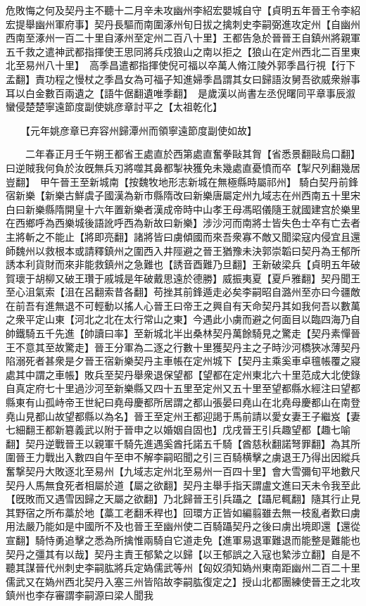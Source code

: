 危敗悔之何及契丹主不聽十二月辛未攻幽州李紹宏嬰城自守【貞明五年晉王令李紹宏提舉幽州軍府事】契丹長驅而南圍涿州旬日拔之擒刺史李嗣弼進攻定州【自幽州西南至涿州一百二十里自涿州至定州二百八十里】王都告急於晉晉王自鎮州將親軍五千救之遣神武都指揮使王思同將兵戍狼山之南以拒之【狼山在定州西北二百里東北至易州八十里】　高季昌遣都指揮使倪可福以卒萬人脩江陵外郭季昌行視【行下孟翻】責功程之慢杖之季昌女為可福子知進婦季昌謂其女曰歸語汝舅吾欲威衆辦事耳以白金數百兩遺之【語牛倨翻遺唯季翻】　是歲漢以尚書左丞倪曙同平章事辰溆蠻侵楚楚寧遠節度副使姚彦章討平之【太祖乾化】

　　【元年姚彦章已弃容州歸潭州而領寧遠節度副使如故】

　　二年春正月壬午朔王都省王處直於西第處直奮拳敺其胷【省悉景翻敺烏口翻】曰逆賊我何負於汝旣無兵刃將噬其鼻都掣袂獲免未幾處直憂憤而卒【掣尺列翻幾居豈翻】　甲午晉王至新城南【按魏牧地形志新城在無極縣時屬祁州】騎白契丹前鋒宿新樂【新樂古鮮虞子國漢為新市縣隋改曰新樂唐屬定州九域志在州西南五十里宋白曰新樂縣隋開皇十六年置新樂者漢成帝時中山孝王母馮昭儀隨王就國建宫於樂里在西鄉呼為西樂城後語訛呼西為新故曰新樂】涉沙河而南將士皆失色士卒有亡去者主將斬之不能止【將即亮翻】諸將皆曰虜傾國而來吾衆寡不敵又聞梁寇内侵宜且還師魏州以救根本或請釋鎮州之圍西入井陘避之晉王猶豫未決郭崇韜曰契丹為王郁所誘本利貨財而來非能救鎮州之急難也【誘音酉難乃旦翻】王新破梁兵【貞明五年破賀瓌于胡柳又破王瓚于戚城是年破戴思遠於德勝】威振夷夏【夏戶雅翻】契丹聞王至心沮氣索【沮在呂翻索昔各翻】苟挫其前鋒遁走必矣李嗣昭自潞州至亦曰今疆敵在前吾有進無退不可輕動以搖人心晉王曰帝王之興自有天命契丹其如我何吾以數萬之衆平定山東【河北之北在太行常山之東】今遇此小虜而避之何面目以臨四海乃自帥鐵騎五千先進【帥讀曰率】至新城北半出桑林契丹萬餘騎見之驚走【契丹素憚晉王不意其至故驚走】晉王分軍為二逐之行數十里獲契丹主之子時沙河橋狹冰薄契丹陷溺死者甚衆是夕晉王宿新樂契丹主車帳在定州城下【契丹主乘奚車卓氊帳覆之寢處其中謂之車帳】敗兵至契丹舉衆退保望都【望都在定州東北六十里范成大北使錄自真定府七十里過沙河至新樂縣又四十五里至定州又五十里至望都縣水經注曰望都縣東有山孤峙帝王世紀曰堯母慶都所居謂之都山張晏曰堯山在北堯母慶都山在南登堯山見都山故望都縣以為名】晉王至定州王都迎謁于馬前請以愛女妻王子繼岌【妻七細翻王都新簒義武以附于晉申之以婚姻自固也】戊戌晉王引兵趣望都【趣七喻翻】契丹逆戰晉王以親軍千騎先進遇奚酋托諾五千騎【酋慈秋翻諾弩罪翻】為其所圍晉王力戰出入數四自午至申不解李嗣昭聞之引三百騎横擊之虜退王乃得出因縱兵奮撃契丹大敗逐北至易州【九域志定州北至易州一百四十里】會大雪彌旬平地數尺契丹人馬無食死者相屬於道【屬之欲翻】契丹主舉手指天謂盧文進曰天未令我至此【旣敗而又遇雪因歸之天屬之欲翻】乃北歸晉王引兵躡之【躡尼輒翻】隨其行止見其野宿之所布藁於地【藁工老翻禾稈也】回環方正皆如編翦雖去無一枝亂者歎曰虜用法嚴乃能如是中國所不及也晉王至幽州使二百騎躡契丹之後曰虜出境即還【還從宣翻】騎恃勇追擊之悉為所擒惟兩騎自它道走免【進軍易退軍難退而能整是難能也契丹之彊其有以哉】契丹主責王郁縶之以歸【以王郁誤之入寇也縶涉立翻】自是不聽其謀晉代州刺史李嗣肱將兵定媯儒武等州【匈奴須知媯州東南距幽州二百二十里儒武又在媯州西北契丹入塞三州皆陷故李嗣肱復定之】授山北都團練使晉王之北攻鎮州也李存審謂李嗣源曰梁人聞我

